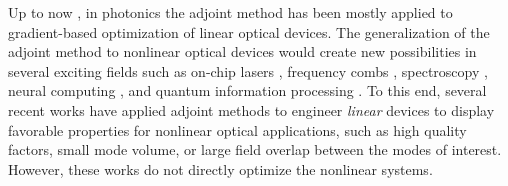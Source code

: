 

Up to now \cite{hughes2018adjoint}, in photonics the adjoint method has been mostly applied to gradient-based optimization of linear optical devices. The generalization of the adjoint method to nonlinear optical devices would create new possibilities in several exciting fields such as on-chip lasers \cite{yamashita_raman_2015}, frequency combs \cite{okawachi_octave-spanning_2011}, spectroscopy \cite{moon_absolute_1997}, neural computing \cite{Khoram_2019}, and quantum information processing \cite{guo_-chip_2016}.  To this end, several recent works \cite{lin_cavity-enhanced_2016,lin_topology_2017,bravo-abad_enhanced_2007} have applied adjoint methods to engineer \textit{linear} devices to display favorable properties for nonlinear optical applications, such as high quality factors, small mode volume, or large field overlap between the modes of interest.  However, these works do not directly optimize the nonlinear systems.

